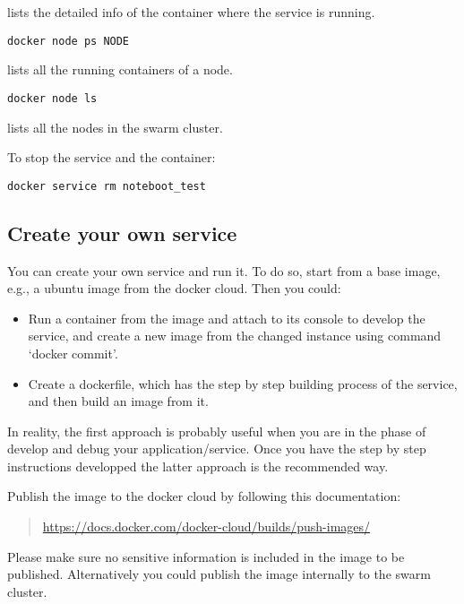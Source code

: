 lists the detailed info of the container where the service is running.

\begin{verbatim}
docker node ps NODE
\end{verbatim}

lists all the running containers of a node.

\begin{verbatim}
docker node ls
\end{verbatim}

lists all the nodes in the swarm cluster.

To stop the service and the container:

\begin{verbatim}
docker service rm noteboot_test
\end{verbatim}


\subsection{Create your own service}\label{create-your-own-service}

You can create your own service and run it. To do so, start from a base
image, e.g., a ubuntu image from the docker cloud. Then you could:

\begin{itemize}

\item Run a container from the image and attach to its console to develop
the service, and create a new image from the changed instance using
command `docker commit'.

\item Create a dockerfile, which has the step by step building process of
the service, and then build an image from it.

\end{itemize}

In reality, the first approach is probably useful when you are in the
phase of develop and debug your application/service. Once you have the
step by step instructions developped the latter approach is the
recommended way.

Publish the image to the docker cloud by following this documentation:

\begin{quote}
\url{https://docs.docker.com/docker-cloud/builds/push-images/}
\end{quote}

Please make sure no sensitive information is included in the image to
be published. Alternatively you could publish the image internally to
the swarm cluster.


